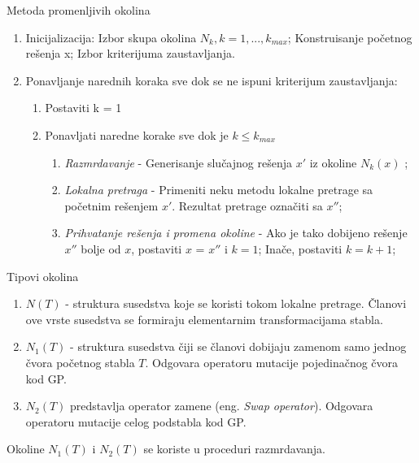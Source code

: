 \documentclass{beamer}
\begin{document}
\begin{frame}{Metoda promenljivih okolina}
\begin{enumerate}
  \item Inicijalizacija: Izbor skupa okolina $N_k, k = 1, ..., k_{max}$; Konstruisanje početnog rešenja x; Izbor kriterijuma zaustavljanja.
  \item Ponavljanje narednih koraka sve dok se ne ispuni kriterijum zaustavljanja:
  \begin{enumerate}
    \item Postaviti k = 1
    \item Ponavljati naredne korake sve dok je $k \leq k_{max}$
        \begin{enumerate}
        \item \textit{Razmrdavanje} - Generisanje slučajnog rešenja $x'$ iz okoline $N_k(x)$ ;
        \item \textit{Lokalna pretraga} - Primeniti neku metodu lokalne pretrage sa početnim rešenjem $x'$. Rezultat pretrage označiti sa $x''$;
        \item \textit{Prihvatanje rešenja i promena okoline} - Ako je tako dobijeno rešenje $x''$ bolje od  $x$, postaviti $x$ = $x''$ i  $k = 1$; Inače, postaviti $k = k + 1$;
      \end{enumerate}
  \end{enumerate}
\end{enumerate}
\end{frame}


\begin{frame}{Tipovi okolina}
\begin{enumerate}
    \item  $N(T)$ - struktura susedstva koje se koristi tokom lokalne pretrage. Članovi ove vrste susedstva se formiraju elementarnim transformacijama stabla.
    \item $N_1(T)$ - struktura susedstva čiji se članovi dobijaju zamenom samo jednog čvora početnog stabla $T$. Odgovara operatoru mutacije pojedinačnog čvora kod GP.
    \item $N_2(T)$ predstavlja operator zamene (eng. \textit{Swap operator}). Odgovara operatoru mutacije celog podstabla kod GP.
\end{enumerate}
Okoline $N_1(T)$ i $N_2(T)$ se koriste u proceduri razmrdavanja.
\end{frame}
\end{document}
